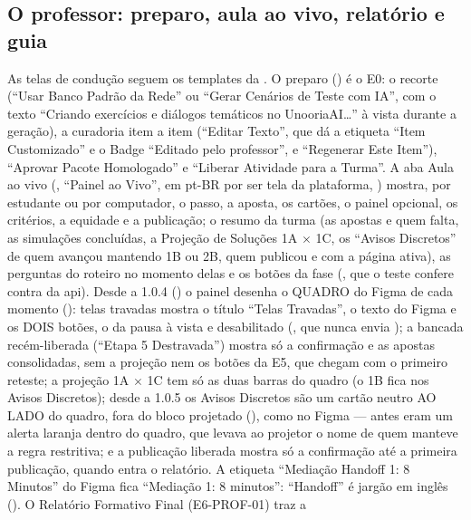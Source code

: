 \subsection{O professor: preparo, aula ao vivo, relatório e guia}

As telas de condução seguem os templates da . O preparo
() é o E0: o recorte
(\enquote{Usar Banco Padrão da Rede} ou \enquote{Gerar Cenários de Teste com
IA}, com o texto \enquote{Criando exercícios e diálogos temáticos no
UnooriaAI\ldots} à vista durante a geração), a curadoria item a item
(\enquote{Editar Texto}, que dá a etiqueta \enquote{Item Customizado} e o
Badge \enquote{Editado pelo professor}, e \enquote{Regenerar Este Item}),
\enquote{Aprovar Pacote Homologado} e \enquote{Liberar Atividade para a
Turma}. A aba Aula ao vivo
(, \enquote{Painel
ao Vivo}, em pt-BR por ser tela da plataforma, ) mostra, por estudante ou por
computador, o passo, a aposta, os cartões, o painel opcional, os critérios, a
equidade e a publicação; o resumo da turma (as apostas e quem falta, as
simulações concluídas, a Projeção de Soluções 1A $\times$ 1C, os
\enquote{Avisos Discretos} de quem avançou mantendo 1B ou 2B, quem publicou e
com a página ativa), as perguntas do roteiro no momento delas e os botões da
fase (, que o teste confere contra 
da api). Desde a 1.0.4 () o painel desenha o QUADRO do Figma de
cada momento (): telas travadas mostra o título
\enquote{Telas Travadas}, o texto do Figma e os DOIS botões, o da pausa à
vista e desabilitado (, que nunca envia ); a
bancada recém-liberada (\enquote{Etapa 5 Destravada}) mostra só a
confirmação e as apostas consolidadas, sem a projeção nem os botões da E5,
que chegam com o primeiro reteste; a projeção 1A $\times$ 1C tem só as duas
barras do quadro (o 1B fica nos Avisos Discretos); desde a 1.0.5 os Avisos
Discretos são um cartão neutro AO LADO do quadro, fora do bloco projetado
(), como no Figma --- antes eram um alerta
laranja dentro do quadro, que levava ao projetor o nome de quem manteve a
regra restritiva; e a publicação liberada
mostra só a confirmação até a primeira publicação, quando entra o relatório.
A etiqueta \enquote{Mediação Handoff 1: 8 Minutos} do Figma fica
\enquote{Mediação 1: 8 minutos}: \enquote{Handoff} é jargão em inglês
(). O Relatório Formativo Final (E6-PROF-01) traz a
